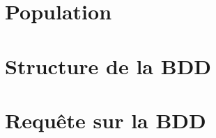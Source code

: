\section{Population}
\label{sec:population}

\section{Structure de la BDD}
\section{Requête sur la BDD}

